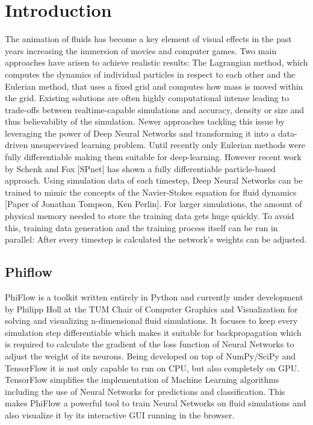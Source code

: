 \chapter{Introduction}\label{chapter:introduction}
The animation of fluids has become a key element of visual effects in the past years increasing the immersion of movies and computer games. Two main approaches have arisen to achieve realistic results: The Lagrangian method, which computes the dynamics of individual particles in respect to each other and the Eulerian method, that uses a fixed grid and computes how mass is moved within the grid. Existing solutions are often highly computational intense leading to trade-offs between realtime-capable simulations and accuracy, density or size and thus believability of the simulation. Newer approaches tackling this issue by leveraging the power of Deep Neural Networks and transforming it into a data-driven unsupervised learning problem. Until recently only Eulerian methods were fully differentiable making them suitable for deep-learning. However recent work by Schenk and Fox [SPnet] has shown a fully differentiable particle-based approach. Using simulation data of each timestep, Deep Neural Networks can be trained to mimic the concepts of the Navier-Stokes equation for fluid dynamics [Paper of Jonathan Tompson, Ken Perlin]. For larger simulations, the amount of physical memory needed to store the training data gets huge quickly. To avoid this, training data generation and the training process itself can be run in parallel: After every timestep is calculated the network's weights can be adjusted.
\section{Phiflow}
PhiFlow is a toolkit written entirely in Python and currently under development by Philipp Holl at the TUM Chair of Computer Graphics and Visualization for solving and visualizing n-dimensional fluid simulations. It focuses to keep every simulation step differentiable which makes it suitable for backpropagation which is required to calculate the gradient of the loss function of Neural Networks to adjust the weight of its neurons. Being developed on top of NumPy/SciPy and TensorFlow it is not only capable to run on CPU, but also completely on GPU. TensorFlow simplifies the implementation of Machine Learning algorithms including the use of Neural Networks for predictions and classification. This makes PhiFlow a powerful tool to train Neural Networks on fluid simulations and also visualize it by its interactive GUI running in the browser. 
